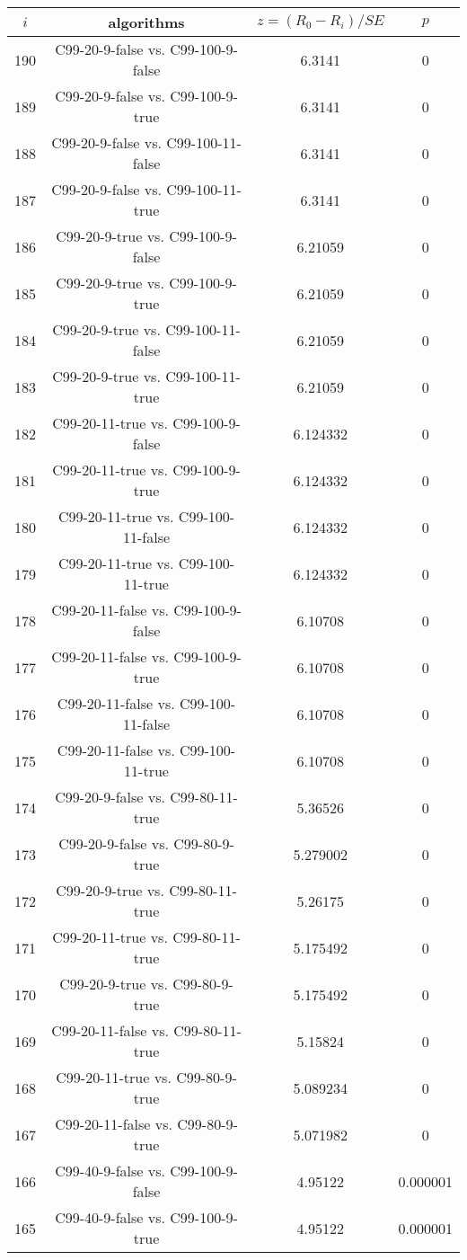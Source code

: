 \documentclass[a4paper,10pt]{article}
\begin{document}
\begin{landscape}
\begin{table}[!htp]
\centering\scriptsize
\begin{tabular}{cccc}
$i$&algorithms&$z=(R_0 - R_i)/SE$&$p$\\
\hline190&C99-20-9-false vs. C99-100-9-false&6.3141&0\\
189&C99-20-9-false vs. C99-100-9-true&6.3141&0\\
188&C99-20-9-false vs. C99-100-11-false&6.3141&0\\
187&C99-20-9-false vs. C99-100-11-true&6.3141&0\\
186&C99-20-9-true vs. C99-100-9-false&6.21059&0\\
185&C99-20-9-true vs. C99-100-9-true&6.21059&0\\
184&C99-20-9-true vs. C99-100-11-false&6.21059&0\\
183&C99-20-9-true vs. C99-100-11-true&6.21059&0\\
182&C99-20-11-true vs. C99-100-9-false&6.124332&0\\
181&C99-20-11-true vs. C99-100-9-true&6.124332&0\\
180&C99-20-11-true vs. C99-100-11-false&6.124332&0\\
179&C99-20-11-true vs. C99-100-11-true&6.124332&0\\
178&C99-20-11-false vs. C99-100-9-false&6.10708&0\\
177&C99-20-11-false vs. C99-100-9-true&6.10708&0\\
176&C99-20-11-false vs. C99-100-11-false&6.10708&0\\
175&C99-20-11-false vs. C99-100-11-true&6.10708&0\\
174&C99-20-9-false vs. C99-80-11-true&5.36526&0\\
173&C99-20-9-false vs. C99-80-9-true&5.279002&0\\
172&C99-20-9-true vs. C99-80-11-true&5.26175&0\\
171&C99-20-11-true vs. C99-80-11-true&5.175492&0\\
170&C99-20-9-true vs. C99-80-9-true&5.175492&0\\
169&C99-20-11-false vs. C99-80-11-true&5.15824&0\\
168&C99-20-11-true vs. C99-80-9-true&5.089234&0\\
167&C99-20-11-false vs. C99-80-9-true&5.071982&0\\
166&C99-40-9-false vs. C99-100-9-false&4.95122&0.000001\\
165&C99-40-9-false vs. C99-100-9-true&4.95122&0.000001\\

\end{tabular}
\end{table}
\end{landscape}
\end{document}
